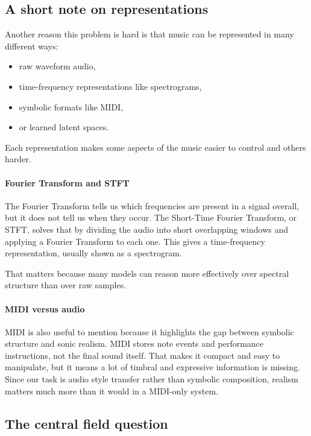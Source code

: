 \documentclass[11pt]{article}
\begin{document}
\subsection{A short note on representations}

Another reason this problem is hard is that music can be represented in many different ways:

\begin{itemize}
\item raw waveform audio,
\item time-frequency representations like spectrograms,
\item symbolic formats like MIDI,
\item or learned latent spaces.
\end{itemize}

Each representation makes some aspects of the music easier to control and others harder.

\paragraph{Fourier Transform and STFT}
The Fourier Transform tells us which frequencies are present in a signal overall, but it does not tell us when they occur. The Short-Time Fourier Transform, or STFT, solves that by dividing the audio into short overlapping windows and applying a Fourier Transform to each one. This gives a time-frequency representation, usually shown as a spectrogram.

That matters because many models can reason more effectively over spectral structure than over raw samples.

\paragraph{MIDI versus audio}
MIDI is also useful to mention because it highlights the gap between symbolic structure and sonic realism. MIDI stores note events and performance instructions, not the final sound itself. That makes it compact and easy to manipulate, but it means a lot of timbral and expressive information is missing. Since our task is audio style transfer rather than symbolic composition, realism matters much more than it would in a MIDI-only system.

\subsection{The central field question}
\end{document}
